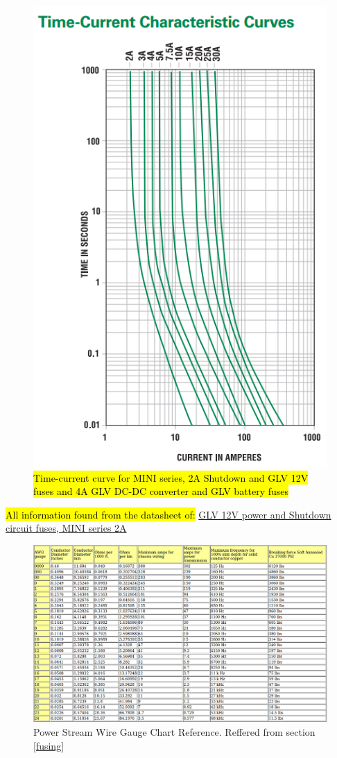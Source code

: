 \documentclass{article}
\DeclareRobustCommand{\hlr}[1]{{\sethlcolor{red}\hl{#1}}}
\begin{document}
\begin{figure}[H]
    \centering
    \includegraphics[width = 0.6 \textwidth]{shutdownfusecurve}
    \caption{\hlr{Time-current curve for MINI series, 2A Shutdown and GLV 12V fuses and 4A GLV DC-DC converter and GLV battery fuses}}
    \label{shutdownfusecurve}
\end{figure}

\hlr{All information found from the datasheet of: }
\href{http://www.littelfuse.com/~/media/automotive/datasheets/fuses/automotive-fuses/littelfuse_automotive_blade_fuse_mini_32v.pdf}{GLV 12V power and Shutdown circuit fuses, MINI series 2A}

\begin{figure}
    \centering
    \includegraphics[width = 1 \textwidth]{WireGaugeChart}
    \caption{Power Stream Wire Gauge Chart Reference. Reffered from section \ref{fusing}}
    \label{AWGchart}
\end{figure}
\end{document}
